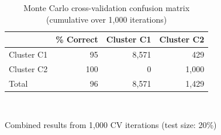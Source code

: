 \begin{table}[htbp]
  \centering
  \caption{Monte Carlo cross-validation confusion matrix (cumulative over 1,000 iterations)}
  \label{tab:03_LDA_Classification_mccv_confusion_matrix}
  \begin{tabular}{lrrr}
    \toprule
     & \% Correct & Cluster C1 & Cluster C2 \\
    \midrule
    Cluster C1 & 95 & 8{,}571 & 429 \\
    Cluster C2 & 100 & 0 & 1{,}000 \\
    Total & 96 & 8{,}571 & 1{,}429 \\
    \bottomrule
  \end{tabular}
  \\[4pt]
  \parbox{\textwidth}{\footnotesize Combined results from 1,000 CV iterations (test size: 20\%)}
\end{table}
